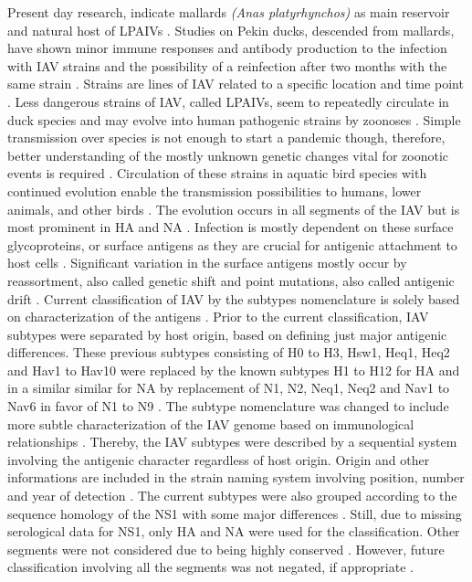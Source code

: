 Present day research, indicate mallards \textit{(Anas platyrhynchos)} as main reservoir and natural host of \glspl{LPAIV} \autocite{jourdain_influenza_2010}. Studies on Pekin ducks, descended from mallards, have shown minor immune responses and antibody production to the infection with \gls{IAV} strains and the possibility of a reinfection after two months with the same strain \autocite{kida_duck_1980}. Strains are lines of \gls{IAV} related to a specific location and time point \autocite{cann_chapter_2016}. Less dangerous strains of \gls{IAV}, called \glspl{LPAIV}, seem to repeatedly circulate in duck species and may evolve into human pathogenic strains by zoonoses \autocite{jourdain_influenza_2010}. Simple transmission over species is not enough to start a pandemic though, therefore, better understanding of the mostly unknown genetic changes vital for zoonotic events is required \autocite{van_reeth_avian_2007}. Circulation of these strains in aquatic bird species with continued evolution enable the transmission possibilities to humans, lower animals, and other birds \autocite{webster_chapter_1999}. The evolution occurs in all segments of the \gls{IAV} but is most prominent in \gls{HA} and \gls{NA} \autocite{webster_chapter_1999}. Infection is mostly dependent on these surface glycoproteins, or surface antigens as they are crucial for antigenic attachment to host cells \autocite{cann_chapter_2016}. Significant variation in the surface antigens mostly occur by reassortment, also called genetic shift and point mutations, also called antigenic drift \autocite{webster_chapter_1999}. Current classification of \gls{IAV} by the subtypes nomenclature is solely based on characterization of the antigens \autocite{noauthor_revision_1980}. Prior to the current classification, \gls{IAV} subtypes were separated by host origin, based on defining just major antigenic differences. These previous subtypes consisting of H0 to H3, Hsw1, Heq1, Heq2 and Hav1 to Hav10 were replaced by the known subtypes H1 to H12 for \gls{HA} and in a similar similar for \gls{NA} by replacement of N1, N2, Neq1, Neq2 and Nav1 to Nav6 in favor of N1 to N9 \autocite{noauthor_revised_1971}. The subtype nomenclature was changed to include more subtle characterization of the \gls{IAV} genome based on immunological relationships \autocite{noauthor_reconsideration_1979}. Thereby, the \gls{IAV} subtypes were described by a sequential system involving the antigenic character regardless of host origin. Origin and other informations are included in the strain naming system involving position, number and year of detection \autocite{noauthor_revision_1980}. The current subtypes were also grouped according to the sequence homology of the \gls{NS1} with some major differences \autocite{noauthor_reconsideration_1979}. Still, due to missing serological data for \gls{NS1}, only \gls{HA} and \gls{NA} were used for the classification. Other segments were not considered due to being highly conserved \autocite{noauthor_reconsideration_1979}. However, future classification involving all the segments was not negated, if appropriate \autocite{noauthor_reconsideration_1979}. %

